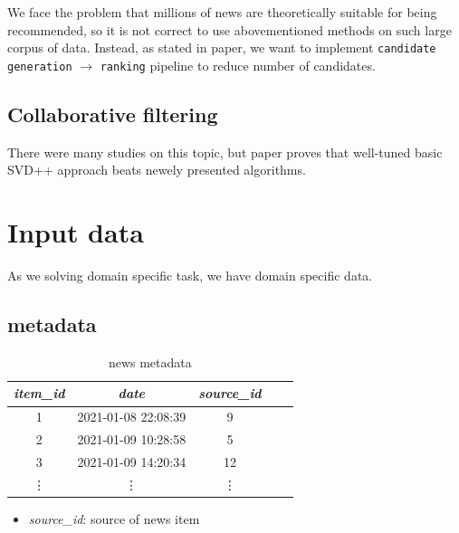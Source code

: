 \documentclass{article}
\begin{document}
We face the problem that millions of news are theoretically suitable for being recommended, so it is not correct to use abovementioned methods on such large corpus of data. Instead, as stated in \citep{youtube} paper, we want to implement \texttt{candidate generation} $\to$ \texttt{ranking} pipeline to reduce number of candidates.



\subsection{Collaborative filtering}

There were many studies on this topic, but paper \citep{evaluation} proves that well-tuned basic SVD++ approach beats newely presented algorithms.



\section{Input data}
\label{sec:input}

As we solving domain specific task, we have domain specific data.

\subsection*{metadata}

\begin{table}[h]
    \centering
    \begin{tabular}{ccccc}
        \toprule

        \emph{item\_id} & \emph{date} & \emph{source\_id} \\\midrule

        1 & 2021-01-08 22:08:39 & 9  \\
        2 & 2021-01-09 10:28:58 & 5  \\
        3 & 2021-01-09 14:20:34 & 12 \\
        \vdots & \vdots & \vdots  \\\bottomrule


     \hline
    \end{tabular}

    \caption{news metadata}
    \label{tab:meta}
\end{table}


\begin{itemize}
    \item \emph{source\_id}: source of news item
\end{itemize}
\end{document}
